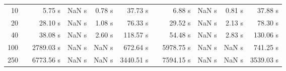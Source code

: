 {\begin{table}[h]
\begin{tabular}{rr rrrr r rrrr}
10 & & 5.75 s &  NaN s & 0.78 s & 37.73 s && 6.88 s &  NaN s & 0.81 s & 37.88 s \\ 
20 & & 28.10 s &  NaN s & 1.08 s & 76.33 s && 29.52 s &  NaN s & 2.13 s & 78.30 s \\ 
40 & & 38.08 s &  NaN s & 2.60 s & 118.57 s && 54.48 s &  NaN s & 2.83 s & 130.06 s \\ 
100 & & 2789.03 s &  NaN s &  NaN s & 672.64 s && 5978.75 s &  NaN s &  NaN s & 741.25 s \\ 
250 & & 6773.56 s &  NaN s &  NaN s & 3440.51 s && 7594.15 s &  NaN s &  NaN s & 3539.03 s \\ 
\hline 
\end{tabular} 
\end{table} 
} 
